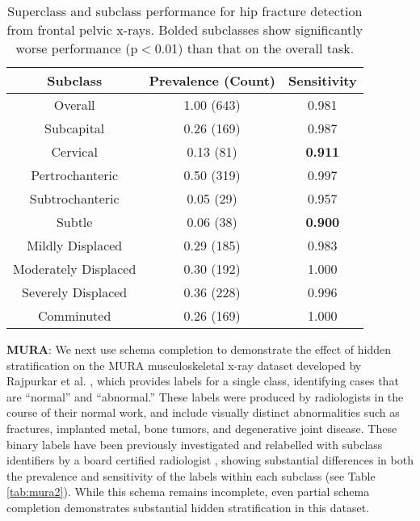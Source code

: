 \documentclass[sigconf,anonymous,review]{acmart}
\begin{document}
\begin{table}[htb!]
\centering
\begin{tabular}{ccc}
\toprule
 Subclass & Prevalence (Count) & Sensitivity \\
 \toprule
 Overall & 1.00 (643) & 0.981  \\
 Subcapital & 0.26 (169) & 0.987   \\
 Cervical & 0.13 (81) & \textbf{0.911}\\
 Pertrochanteric & 0.50 (319)  & 0.997\\
 Subtrochanteric & 0.05 (29) & 0.957 \\
 Subtle & 0.06 (38) & \textbf{0.900}\\
 Mildly Displaced & 0.29 (185) & 0.983\\
 Moderately Displaced & 0.30 (192) & 1.000\\
 Severely Displaced & 0.36 (228) & 0.996\\
 Comminuted & 0.26 (169) & 1.000 \\ 
 \toprule
\end{tabular}
\caption{Superclass and subclass performance for hip fracture detection from frontal pelvic x-rays. Bolded subclasses show significantly worse performance (p$<$0.01) than that on the overall task.}
\label{tab:hip1}
\end{table}

\textbf{MURA}: We next use schema completion to demonstrate the effect of hidden stratification on the MURA musculoskeletal x-ray dataset developed by Rajpurkar et al. \citep{Rajpurkar2017-rc}, which provides labels for a single class, identifying cases that are ``normal'' and ``abnormal.'' 
These labels were produced by radiologists in the course of their normal work, and include visually distinct abnormalities such as fractures, implanted metal, bone tumors, and degenerative joint disease. 
These binary labels have been previously investigated and relabelled with subclass identifiers by a board certified radiologist \citep{Oakden-Rayner2019-yi}, showing substantial differences in both the prevalence and sensitivity of the labels within each subclass (see Table \ref{tab:mura2}). 
While this schema remains incomplete, even partial schema completion demonstrates substantial hidden stratification in this dataset.
\end{document}

